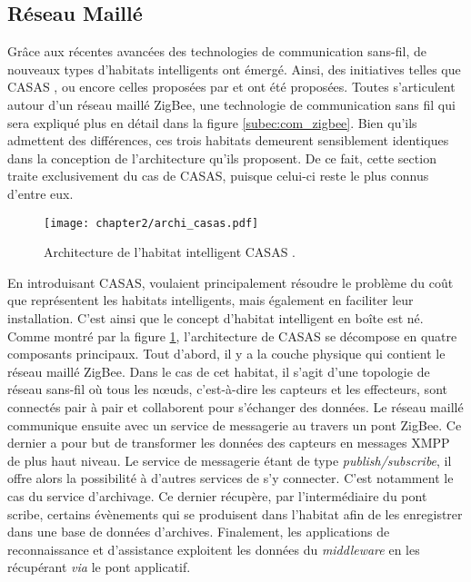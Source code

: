 \subsection{Réseau Maillé}

Grâce aux récentes avancées des technologies de communication sans-fil, de nouveaux types d'habitats intelligents ont émergé. Ainsi, des initiatives telles que CASAS \citep{Cook2013}, ou encore celles proposées par \cite{Zhihua2016} et \cite{Zhenyu2011} ont été proposées. Toutes s'articulent autour d'un réseau maillé ZigBee, une technologie de communication sans fil qui sera expliqué plus en détail dans la figure \ref{subec:com_zigbee}. Bien qu'ils admettent des différences, ces trois habitats demeurent sensiblement identiques dans la conception de l'architecture qu'ils proposent. De ce fait, cette section traite exclusivement du cas de CASAS, puisque celui-ci reste le plus connus d'entre eux.

\begin{figure}[H]
	\centering
	\texttt{[image: chapter2/archi\_casas.pdf]}
	\caption[Architecture de l'habitat intelligent CASAS.]{Architecture de l'habitat intelligent CASAS \citep{Cook2013}.}
	\label{fig:archi_casas}
\end{figure}

En introduisant CASAS, \cite{Cook2013} voulaient principalement résoudre le problème du coût que représentent les habitats intelligents, mais également en faciliter leur installation. C'est ainsi que le concept d'habitat intelligent en boîte est né. Comme montré par la figure \ref{fig:archi_casas}, l'architecture de CASAS se décompose en quatre composants principaux. Tout d'abord, il y a la couche physique qui contient le réseau maillé ZigBee. Dans le cas de cet habitat, il s'agit d'une topologie de réseau sans-fil où tous les n\oe{}uds, c'est-à-dire les capteurs et les effecteurs, sont connectés pair à pair et collaborent pour s'échanger des données. Le réseau maillé communique ensuite avec un service de messagerie au travers un pont ZigBee. Ce dernier a pour but de transformer les données des capteurs en messages \ac{XMPP} de plus haut niveau. Le service de messagerie étant de type \textit{publish/subscribe}, il offre alors la possibilité à d'autres services de s'y connecter. C'est notamment le cas du service d'archivage. Ce dernier récupère, par l'intermédiaire du pont scribe, certains évènements qui se produisent dans l'habitat afin de les enregistrer dans une base de données d'archives. Finalement, les applications de reconnaissance et d'assistance exploitent les données du \textit{middleware} en les récupérant \textit{via} le pont applicatif.

